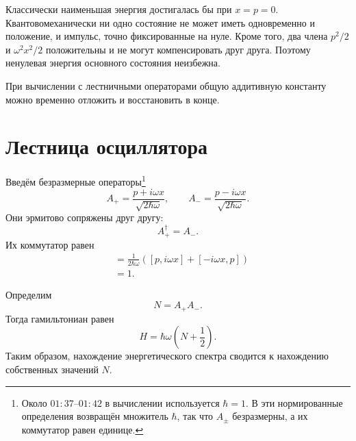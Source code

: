 Классически наименьшая энергия достигалась бы при \(x=p=0\). Квантовомеханически ни одно состояние не может иметь одновременно и положение, и импульс, точно фиксированные на нуле. Кроме того, два члена \(p^2/2\) и \(\omega^2x^2/2\) положительны и не могут компенсировать друг друга. Поэтому ненулевая энергия основного состояния неизбежна.

При вычислении с лестничными операторами общую аддитивную константу можно временно отложить и восстановить в конце.

\begin{classroomqa}
\end{classroomqa}

\section{Лестница осциллятора}

Введём безразмерные операторы\footnote{Около \(01{:}37\)--\(01{:}42\) в вычислении используется \(\hbar=1\). В эти нормированные определения возвращён множитель \(\hbar\), так что \(A_\pm\) безразмерны, а их коммутатор равен единице.}
\begin{equation}
A_+=\frac{p+i\omega x}{\sqrt{2\hbar\omega}},
\qquad
A_-=\frac{p-i\omega x}{\sqrt{2\hbar\omega}}.
\end{equation}
Они эрмитово сопряжены друг другу:
\begin{equation}
A_+^\dagger=A_-.
\end{equation}
Их коммутатор равен
\begin{align}
[A_-,A_+]
&=\frac{1}{2\hbar\omega}
\left([p,i\omega x]+[-i\omega x,p]\right) \\
&=1.
\end{align}

Определим
\begin{equation}
N=A_+A_-.
\end{equation}
Тогда гамильтониан равен
\begin{equation}
H=\hbar\omega\left(N+\frac{1}{2}\right).
\end{equation}
Таким образом, нахождение энергетического спектра сводится к нахождению собственных значений \(N\).

